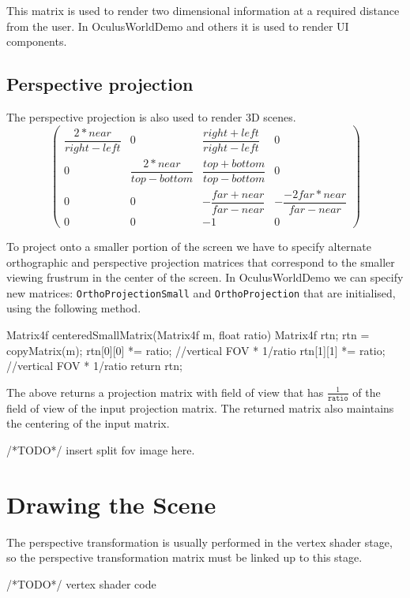 \documentclass[12pt,a4paper,twoside,openright]{report}
\begin{document}
This matrix is used to render two dimensional information at a required distance from the user. In OculusWorldDemo and others it is used to render UI components.
\subsection{Perspective projection}

The perspective projection is also used to render 3D scenes.
\[
\begin{pmatrix}
\dfrac{2*near}{right-left} & 0 & \dfrac{right + left}{right - left} & 0 \\
0 & \dfrac{2*near}{top-bottom} & \dfrac{top+bottom}{top-bottom} & 0 \\
0 & 0 & -\dfrac{far + near}{far-near} & -\dfrac{-2far*near}{far-near} \\
0 & 0 & -1 & 0
\end{pmatrix}
\]

To project onto a smaller portion of the screen we have to specify alternate orthographic and perspective projection matrices that correspond to the smaller viewing frustrum in the center of the screen. In OculusWorldDemo we can specify new matrices: \texttt{OrthoProjectionSmall} and \texttt{OrthoProjection} that are initialised, using the following method.

\begin{blockcode}
Matrix4f centeredSmallMatrix(Matrix4f m, float ratio){
    Matrix4f rtn; 
    rtn = copyMatrix(m);
    rtn[0][0] *= ratio; //vertical FOV * 1/ratio
    rtn[1][1] *= ratio; //vertical FOV * 1/ratio
    return rtn;
}
\end{blockcode}

The above returns a projection matrix with field of view that has $\frac{1}{\texttt{ratio}}$ of the field of view of the input projection matrix. The returned matrix also maintains the centering of the input matrix.

/*TODO*/ insert split fov image here. 

\section{Drawing the Scene}

The perspective transformation is usually performed in the vertex shader stage, so the perspective transformation matrix must be linked up to this stage.


\begin{blockcode}
/*TODO*/ vertex shader code
\end{blockcode} 
\end{document}
